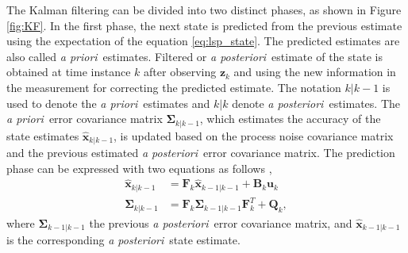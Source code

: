 \documentclass[english, 12pt, a4paper, elec, utf8, a-1b, online]{aaltothesis}
\renewcommand{\vec}[1]{\mathbf{#1}}
\newcommand{\xprior}{\hat{\vec{x}}_{k|k-1}}
\newcommand{\xlast}{\hat{\vec{x}}_{k-1|k-1}}
\newcommand{\priorecov}{\boldsymbol{\Sigma}_{k|k-1}}
\newcommand{\lastecov}{\boldsymbol{\Sigma}_{k-1|k-1}}
\newcommand{\z}{\vec{z}_k}
\newcommand{\stmodel}{\vec{F}_k}
\newcommand{\cimodel}{\vec{B}_k}
\newcommand{\cinput}{\vec{u}_k}
\newcommand{\pcov}{\vec{Q}_k}
\def\prior{\textit{a priori}\ }
\def\post{\textit{a posteriori}\ }
\begin{document}
The Kalman filtering can be divided into two distinct phases, as shown in Figure \ref{fig:KF}.
In the first phase, the next state is predicted from the previous estimate using the expectation of the equation \eqref{eq:lsp_state}.
The predicted estimates are also called \prior estimates.
Filtered or \post estimate of the state is obtained at time instance $k$ after observing $\z$ and using the new information in the measurement for correcting the predicted estimate. 
The notation $k|k-1$ is used to denote the \prior estimates and $k|k$ denote \post estimates.
The \prior error covariance matrix $\priorecov$, which estimates the accuracy of the state estimates $\xprior$, is updated based on the process noise covariance matrix and the previous estimated \post error covariance matrix.
The prediction phase can be expressed with two equations as follows \cite{Zarchan2000},
\begin{subequations}
\label{eq:kf_predict}
\begin{align}
    \xprior &= \stmodel \xlast + \cimodel \cinput \label{eq:kf_pred_x} \\ 
    \priorecov &= \stmodel \lastecov \stmodel^T + \pcov \label{eq:kf_prior_error_cov},
\end{align}
\end{subequations}
where $\lastecov$ the previous \post error covariance matrix, and $\xlast$ is the corresponding \post state estimate.
\end{document}
